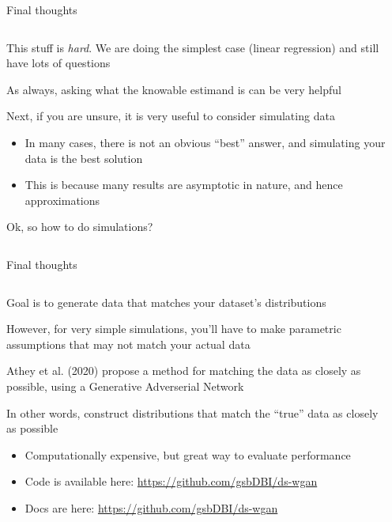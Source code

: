 \documentclass[notes,11pt, aspectratio=169]{beamer}
\newenvironment{wideitemize}{\itemize\addtolength{\itemsep}{10pt}}{\enditemize}
\begin{document}
\begin{frame}{Final thoughts}
\begin{columns}[T] %
\begin{column}{.8\textwidth}
  \begin{wideitemize}
  \item This stuff is \emph{hard}. We are doing the simplest case
    (linear regression) and still have lots of questions
  \item As always, asking what the knowable estimand is can be very helpful
  \item Next, if you are unsure, it is very useful to consider simulating data
    \begin{itemize}
    \item In many cases, there is not an obvious ``best'' answer, and simulating your data is the best solution
    \item This is because many results are asymptotic in nature, and hence approximations
    \end{itemize}
    \item Ok, so how to do simulations?
  \end{wideitemize}
  \end{column}
  \hfill%
  \begin{column}{.3\textwidth}
  \end{column}
  \end{columns}
\end{frame}


\begin{frame}{Final thoughts}
\begin{columns}[T] %
\begin{column}{.8\textwidth}
  \begin{wideitemize}
  \item Goal is to generate data that matches your dataset's distributions
  \item However, for very simple simulations, you'll have to make
    parametric assumptions that may not match your actual data
  \item Athey et al. (2020) propose a method for matching the data as
    closely as possible, using a Generative Adverserial Network
  \item In other words, construct distributions that match the ``true'' data as
    closely as possible
    \begin{itemize}
    \item Computationally expensive, but great way to evaluate performance
    \item Code is available here: \url{https://github.com/gsbDBI/ds-wgan}
    \item Docs are here: \url{https://github.com/gsbDBI/ds-wgan}
    \end{itemize}
  \end{wideitemize}
  \end{column}
  \hfill%
  \begin{column}{.3\textwidth}
  \end{column}
  \end{columns}
\end{frame}
\end{document}
